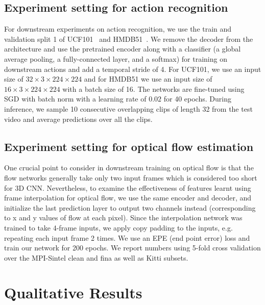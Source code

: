 \documentclass[10pt,twocolumn,letterpaper]{article}
\begin{document}
\subsection{Experiment setting for action recognition}
\label{appendix:action_recognition}

For downstream experiments on action recognition, we use the train and validation split 1 of UCF101~\cite{UCF101} and HMDB51~\cite{kuehne2011hmdb}. We remove the decoder from the architecture and use the pretrained encoder along with a classifier (a global average pooling, a fully-connected layer, and a softmax) for training on downstream actions and add a temporal stride of 4. For UCF101, we use an input size of $32 \times 3 \times 224 \times 224$ and for HMDB51 we use an input size of $16 \times 3 \times 224 \times 224$ with a batch size of 16. The networks are fine-tuned using SGD with batch norm with a learning rate of $0.02$ for 40 epochs. During inference, we sample 10 consecutive overlapping clips of length 32 from the test video and average predictions over all the clips.



\subsection{Experiment setting for optical flow estimation}
\label{appendix:flow_estimation}

One crucial point to consider in downstream training on optical flow is that the flow networks generally take only two input frames which is considered too short for 3D CNN. Nevertheless, to examine the effectiveness of features learnt using frame interpolation for optical flow, we use the same encoder and decoder, and initialize the last prediction layer to output two channels instead (corresponding to x and y values of flow at each pixel). Since the interpolation network was trained to take 4-frame inputs, we apply copy padding to the inputs, e.g. repeating each input frame 2 times. We use an EPE (end point error) loss and train our network for 200 epochs. We report numbers using 5-fold cross validation over the MPI-Sintel clean and fina as well as Kitti subsets.

\section{Qualitative Results}
\label{appendix:qual}
\end{document}
